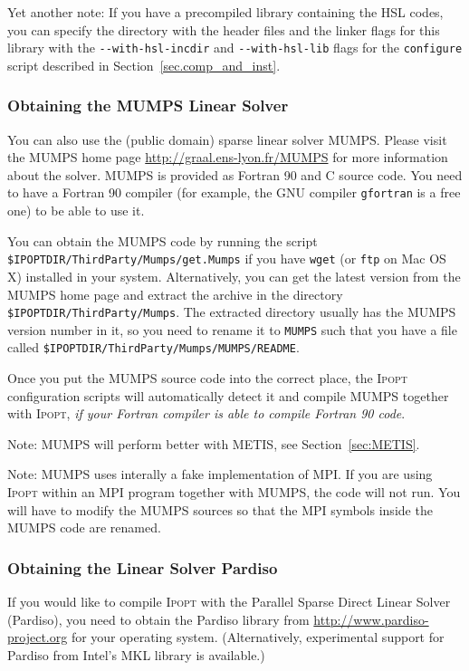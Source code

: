 \documentclass[10pt]{article}
\newcommand{\Ipopt}{\textsc{Ipopt}\xspace}
\begin{document}
Yet another note: If you have a precompiled library containing the
HSL codes, you can specify the directory with the header files and
the linker flags for this library with the \verb|--with-hsl-incdir| and
\verb|--with-hsl-lib| flags for the {\tt configure} script described in
Section~\ref{sec.comp_and_inst}.

\subsubsection{Obtaining the MUMPS Linear Solver}\label{sec:MUMPS}

You can also use the (public domain) sparse linear solver MUMPS.
Please visit the MUMPS home page \url{http://graal.ens-lyon.fr/MUMPS}
for more information about the solver. MUMPS is provided as Fortran 90
and C source code.  You need to have a Fortran 90 compiler (for
example, the GNU compiler {\tt gfortran} is a free one) to be able to
use it.

You can obtain the MUMPS code by running the script
{\tt \$IPOPTDIR/ThirdParty/Mumps/get.Mumps} if you have {\tt wget} 
(or {\tt ftp} on Mac OS X) installed in your system. 
Alternatively, you can get the latest version
from the MUMPS home page and extract the archive in the
directory {\tt \$IPOPTDIR/ThirdParty/Mumps}.  The extracted
directory usually has the MUMPS version number in it, so you need to
rename it to {\tt MUMPS} such that you have a file called
{\tt \$IPOPTDIR/ThirdParty/Mumps/MUMPS/README}.

Once you put the MUMPS source code into the correct place, the \Ipopt
configuration scripts will automatically detect it and compile MUMPS
together with \Ipopt, \emph{if your Fortran compiler is able to compile
Fortran 90 code}.

Note: MUMPS will perform better with METIS, see
Section~\ref{sec:METIS}.

Note: MUMPS uses interally a fake implementation of MPI.  If you are
using \Ipopt within an MPI program together with MUMPS, the code will
not run.  You will have to modify the MUMPS sources so that the MPI
symbols inside the MUMPS code are renamed.

\subsubsection{Obtaining the Linear Solver Pardiso}\label{sec:Pardiso}

If you would like to compile \Ipopt with the Parallel Sparse Direct
Linear Solver (Pardiso), you need to obtain
the Pardiso library from \url{http://www.pardiso-project.org} for
your operating system. (Alternatively, experimental support for
Pardiso from Intel's MKL library is available.)
\end{document}
